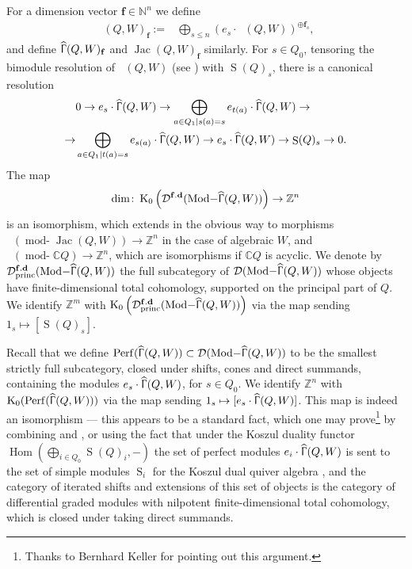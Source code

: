 \documentclass[a4paper,10pt]{amsart}
\newcommand{\ff}{\mathbf{f}}
\DeclareMathOperator{\DIM}{dim}
\DeclareMathOperator{\Simp}{S}
\renewcommand{\Gamma}{\Upgamma}
\DeclareMathOperator{\KK}{K_0}
\DeclareMathOperator{\Hom}{Hom}
\DeclareMathOperator{\fd}{\mathbf{f.d}}
\DeclareMathOperator{\tmod}{mod-}
\DeclareMathOperator{\Tmod}{Mod-}
\newcommand{\rmod}[1]{\tmod\!#1}
\newcommand{\Rmod}[1]{\Tmod\!#1}
\DeclareMathOperator{\Jac}{Jac}
\DeclareMathOperator{\HJac}{\widehat{Jac}}
\DeclareMathOperator{\Perf}{Perf}
\DeclareMathOperator{\HGamma}{\widehat{\Gamma}}
\DeclareMathOperator{\princ}{princ}
\newcommand{\Dub}{\mathcal{D}}
\begin{document}
For a dimension vector $\ff\in\mathbb{N}^{n}$ we define
\begin{align*}
\HJac(Q,W)_{\ff}:=&\bigoplus_{s\leq n}\left(e_s\cdot \HJac(Q,W)\right)^{\oplus\ff_s},
\end{align*}
and define $\HGamma(Q,W)_{\ff}$ and $\Jac(Q,W)_{\ff}$ similarly.  For $s\in Q_0$, tensoring the bimodule resolution of $\HJac(Q,W)$ (see \cite[Prop.5.1.9]{ginz}) with $\Simp(Q)_s$, there is a canonical resolution
\begin{align}
\label{resolution}
&0\rightarrow e_s\cdot \HGamma(Q,W)\rightarrow \bigoplus_{a\in Q_1|s(a)=s} e_{t(a)}\cdot\HGamma(Q,W)\rightarrow\\ \rightarrow &\bigoplus_{a\in Q_1|t(a)=s}e_{s(a)}\cdot\HGamma(Q,W) \rightarrow e_s\cdot\HGamma(Q,W)\rightarrow \Simp(Q)_{s}\rightarrow 0.\nonumber
\end{align}
The map 
\[
\DIM\colon\KK\left(\Dub^{\fd}(\Rmod{\HGamma(Q,W)})\right)\rightarrow \mathbb{Z}^{n}
\]
is an isomorphism, which extends in the obvious way to morphisms $\KK(\rmod{\Jac(Q,W)})\rightarrow \mathbb{Z}^{n}$ in the case of algebraic $W$, and $\KK(\rmod{\mathbb{C}Q})\rightarrow\mathbb{Z}^{n}$, which are isomorphisms if $\mathbb{C}Q$ is acyclic.  We denote by $\Dub_{\princ}^{\fd}(\Rmod{\HGamma(Q,W)})$ the full subcategory of $\Dub(\Rmod{\HGamma(Q,W)})$ whose objects have finite-dimensional total cohomology, supported on the principal part of $Q$.  We identify $\mathbb{Z}^{m}$ with $\KK\left(\Dub_{\princ}^{\fd}(\Rmod{\HGamma(Q,W)})\right)$ via the map sending $1_s\mapsto [\Simp(Q)_{s}]$.  

Recall that we define $\Perf(\HGamma(Q,W))\subset \Dub(\Rmod{\HGamma(Q,W)})$ to be the smallest strictly full subcategory, closed under shifts, cones and direct summands, containing the modules $e_s\cdot \HGamma(Q,W)$, for $s\in Q_0$.  We identify $\mathbb{Z}^{n}$ with $\KK(\Perf(\HGamma(Q,W)))$ via the map sending $1_s\mapsto [e_s\cdot \HGamma(Q,W)]$.  This map is indeed an isomorphism --- this appears to be a standard fact, which one may prove\footnote{Thanks to Bernhard Keller for pointing out this argument.} by combining \cite[Lem.5.2.1]{Bon10} and \cite[Lem.2.17]{KellerMutations}, or using the fact that under the Koszul duality functor $\Hom(\bigoplus_{i\in Q_0}\Simp(Q)_i,-)$ the set of perfect modules $e_i\cdot\HGamma(Q,W)$ is sent to the set of simple modules $\Simp_i$ for the Koszul dual quiver algebra \cite[Thm.5.4]{Koszul}, and the category of iterated shifts and extensions of this set of objects is the category of differential graded modules with nilpotent finite-dimensional total cohomology, which is closed under taking direct summands.  
\end{document}
